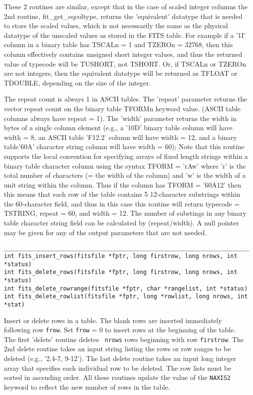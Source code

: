 \documentclass[11pt]{article}
\begin{document}
These 2 routines are similar, except that in the case of scaled
integer columns the 2nd routine, fit\_get\_eqcoltype, returns the
'equivalent' datatype that is needed to store the scaled values, which
is not necessarily the same as the physical datatype of the unscaled values
as stored in the FITS table.  For example if a '1I' column in a binary
table has TSCALn = 1 and TZEROn = 32768, then this column effectively
contains unsigned short integer values, and thus the returned value of
typecode will be TUSHORT, not TSHORT.  Or, if TSCALn or TZEROn are not
integers, then the equivalent datatype will be returned as TFLOAT or
TDOUBLE, depending on the size of the integer.

The repeat count is always 1 in ASCII tables.
The 'repeat' parameter returns the vector repeat count on the binary
table TFORMn keyword value. (ASCII table columns always have repeat
= 1).  The 'width' parameter returns the width in bytes of a single
column element (e.g., a '10D' binary table column will have width =
8, an ASCII table 'F12.2' column will have width = 12, and a binary
table'60A' character string  column will have width = 60);  Note that
this routine supports the local convention for specifying arrays of
fixed length strings within a binary table character column using
the syntax TFORM = 'rAw' where 'r' is the total number of
characters (= the width of the column) and 'w' is the width of a
unit string within the column.  Thus if the column has TFORM =
'60A12' then this means that each row of the table contains
5 12-character substrings within the 60-character field, and thus 
in this case this routine will return typecode = TSTRING, repeat =
60, and width = 12.  The number of substings in any binary table
character string field can be calculated by (repeat/width). 
A null pointer may be given for any of the output parameters that
 are not needed.

\begin{verbatim}
____________________________________________________________________________
int fits_insert_rows(fitsfile *fptr, long firstrow, long nrows, int *status)
int fits_delete_rows(fitsfile *fptr, long firstrow, long nrows, int *status)
int fits_delete_rowrange(fitsfile *fptr, char *rangelist, int *status)
int fits_delete_rowlist(fitsfile *fptr, long *rowlist, long nrows, int *stat)
\end{verbatim}

Insert or delete rows in a table.  The blank rows are inserted
immediately following row {\tt frow}. Set {\tt frow} = 0 to insert rows
at the beginning of the table.  The first 'delete' routine deletes {\tt
nrows} rows beginning with row {\tt firstrow}.   The 2nd delete routine
takes an input string listing the rows or row ranges to be deleted
(e.g., '2,4-7, 9-12').  The last delete routine takes an input long
integer array that specifies each individual row to be deleted.  The
row lists must be sorted in ascending order.  All these routines update
the value of the {\tt NAXIS2} keyword to reflect the new number of rows
in the table.
\end{document}
